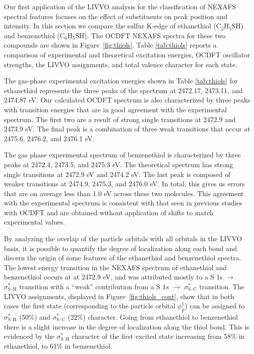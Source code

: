 \documentclass{article}
\begin{document}
Our first application of the LIVVO analysis for the classification of NEXAFS spectral features focuses on the effect of substituents on peak position and intensity.
In this section we compare the sulfur K-edge of ethanethiol (C$_2$H$_5$SH) and benzenethiol (C$_6$H$_5$SH).
The OCDFT NEXAFS spectra for these two compounds are shown in Figure~\ref{fig:thiols}.
Table \ref{tab:thiols} reports a comparison of experimental and theoretical excitation energies, OCDFT oscillator strengths, the LIVVO assignments, and total valence character for each state. 

The gas-phase experimental excitation energies shown in Table \ref{tab:thiols} for ethanethiol represents the three peaks of the spectrum at 2472.17, 2473.11, and 2474.87 eV. Our calculated OCDFT spectrum is also characterized by three peaks with transition energies that are in good agreement with the experimental spectrum. The first two are a result of strong single transitions at  2472.9 and 2473.9 eV. The final peak is a combination of three weak transitions that occur at 2475.6, 2476.2, and 2476.1 eV. 

The gas phase experimental spectrum of benzenethiol is characterized by three peaks at 2472.4, 2473.5, and 2475.3 eV. The theoretical spectrum has strong single transitions at 2472.9 eV and 2474.2 eV. The last peak is composed of weaker transitions at 2474.9, 2475.3, and 2476.0 eV.
In total, this gives us errors that are on average less than 1.0 eV across these two molecules. This agreement with the experimental spectrum is consistent with that seen in previous studies with OCDFT\cite{derricotte_simulation_2015,verma_predicting_2016} and are obtained without application of shifts to match experimental values.

By analyzing the overlap of the particle orbitals with all orbitals in the LIVVO basis, it is possible to quantify the degree of localization along each bond and discern the origin of some features of the ethanethiol and benzenethiol spectra.
The lowest energy transition in the NEXAFS spectrum of ethanethiol and benzenethiol occurs at  at 2472.9 eV, and was attributed mostly to a S 1s $\rightarrow$ $\sigma^*_\text{S--H}$ transition with a ``weak'' contribution from a S 1$s$ $\rightarrow$ $\sigma^*_\text{S--C}$ transition.\cite{behyan_sulfur_2013}
The LIVVO assignments, displayed in Figure~\ref{fig:thiols_cont}, show that in both cases the first state (corresponding to the particle orbital $\phi_\mathrm{p}^1$) can be assigned to $\sigma^*_\text{S--H}$ (50\%) and $\sigma^*_\text{S--C}$ (22\%) character. Going from ethanethiol to benzenethiol there is a slight increase in the degree of localization along the thiol bond. This is evidenced by the $\sigma^*_\text{S--H}$ character of the first excited state increasing from 58\% in ethanethiol, to 61\% in benzenethiol.
\end{document}
